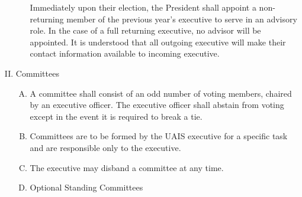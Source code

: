 \documentclass[11pt]{article}
\begin{document}
\begin{enumerate}[I.]
\begin{enumerate}[A)]
        Immediately upon their election, the President shall appoint a
        non-returning member of the previous year's executive to serve in an
        advisory role. In the case of a full returning executive, no advisor
        will be appointed. It is understood that all outgoing executive will
        make their contact information available to incoming executive.
    \end{enumerate}
  \item Committees
    \begin{enumerate}[A)]
      \item A committee shall consist of an odd number of voting members,
        chaired by an executive officer. The executive officer shall abstain
        from voting except in the event it is required to break a tie.
      \item Committees are to be formed by the UAIS executive for a specific task and are responsible only to the executive.
      \item The executive may disband a committee at any time.
      \item Optional Standing Committees


\end{enumerate}
\end{enumerate}
\end{document}
